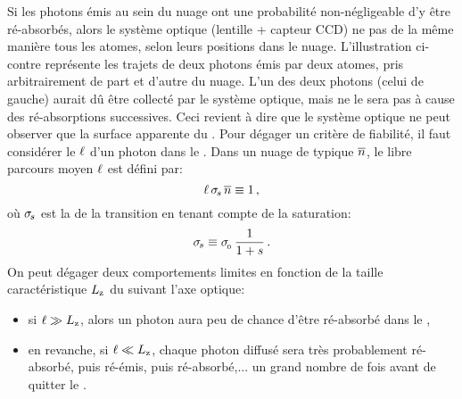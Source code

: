 \noindent Si les photons émis au sein du nuage ont une probabilité non-négligeable d'y être ré-absorbés, alors le système optique (lentille + capteur CCD) ne  pas de la même manière tous les atomes, selon leurs positions dans le nuage. L'illustration ci-contre représente les trajets de deux photons émis par deux atomes, pris arbitrairement de part et d'autre du nuage. L'un des deux photons (celui de gauche) aurait dû être collecté par le système optique, mais ne le sera pas à cause des ré-absorptions successives.
Ceci revient à dire que le système optique ne peut observer que la surface apparente du \n.
\noindent Pour dégager un critère de fiabilité, il faut considérer le  ${\ell}$ %
%
d'un photon dans le \n. Dans un nuage de \dat typique $\overline{{n}}$, le libre parcours moyen ${\ell}$ est défini par:
\begin{equation}
	\Dlibre \, \seceffsat \, \overline{\dens} \equiv 1
	\virguleformule
	\label{eq:LibreParcours}
\end{equation}
où ${\sigma_{\hspace{-1pt}{{s}}}}$ est la \seff de la transition en tenant compte de la saturation:\label{sec:ReAbsorption}
\begin{equation}
	\seceffsat \equiv \seceff \, \frac{1}{1+\sat}
	\pointformule
	\label{eq:SecEffSat}
\end{equation}
%
\noindent
On peut dégager deux comportements limites en fonction de la taille caractéristique ${L_{\rm z}}$ du \n suivant l'axe optique: 
\begin{itemize}
	\item si ${\ell}\gg{L_{\rm z}}$, alors un photon aura peu de chance d'être ré-absorbé dans le \n, 
	\item en revanche, si ${\ell} \ll {L_{\rm z}}$, chaque photon diffusé sera très probablement ré-absorbé, puis ré-émis, puis ré-absorbé,... un grand nombre de fois avant de quitter le \n.
\end{itemize}
%
\ApplicationNumerique
